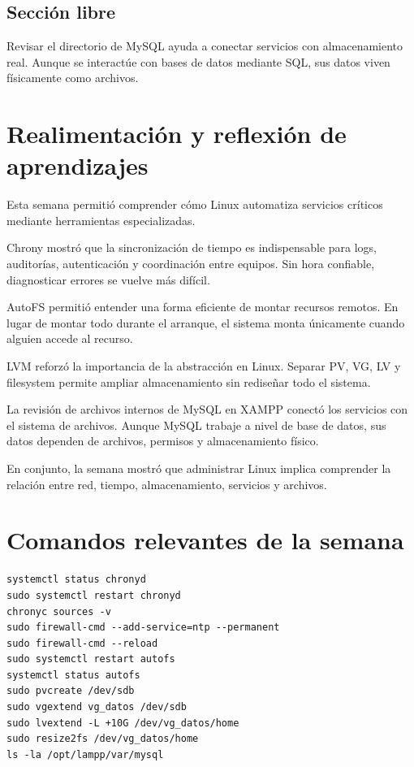 \documentclass[11pt, letterpaper]{article}
\begin{document}
\subsection{Sección libre}
\label{sec:org10ed2c1}

Revisar el directorio de MySQL ayuda a conectar servicios con almacenamiento real. Aunque se interactúe con bases de datos mediante SQL, sus datos viven físicamente como archivos.

\newpage
\section{Realimentación y reflexión de aprendizajes}
\label{sec:org99a6992}

Esta semana permitió comprender cómo Linux automatiza servicios críticos mediante herramientas especializadas.

Chrony mostró que la sincronización de tiempo es indispensable para logs, auditorías, autenticación y coordinación entre equipos. Sin hora confiable, diagnosticar errores se vuelve más difícil.

AutoFS permitió entender una forma eficiente de montar recursos remotos. En lugar de montar todo durante el arranque, el sistema monta únicamente cuando alguien accede al recurso.

LVM reforzó la importancia de la abstracción en Linux. Separar PV, VG, LV y filesystem permite ampliar almacenamiento sin rediseñar todo el sistema.

La revisión de archivos internos de MySQL en XAMPP conectó los servicios con el sistema de archivos. Aunque MySQL trabaje a nivel de base de datos, sus datos dependen de archivos, permisos y almacenamiento físico.

En conjunto, la semana mostró que administrar Linux implica comprender la relación entre red, tiempo, almacenamiento, servicios y archivos.
\section{Comandos relevantes de la semana}
\label{sec:org05598ad}

\begin{verbatim}
systemctl status chronyd
sudo systemctl restart chronyd
chronyc sources -v
sudo firewall-cmd --add-service=ntp --permanent
sudo firewall-cmd --reload
sudo systemctl restart autofs
systemctl status autofs
sudo pvcreate /dev/sdb
sudo vgextend vg_datos /dev/sdb
sudo lvextend -L +10G /dev/vg_datos/home
sudo resize2fs /dev/vg_datos/home
ls -la /opt/lampp/var/mysql
\end{verbatim}
\end{document}
